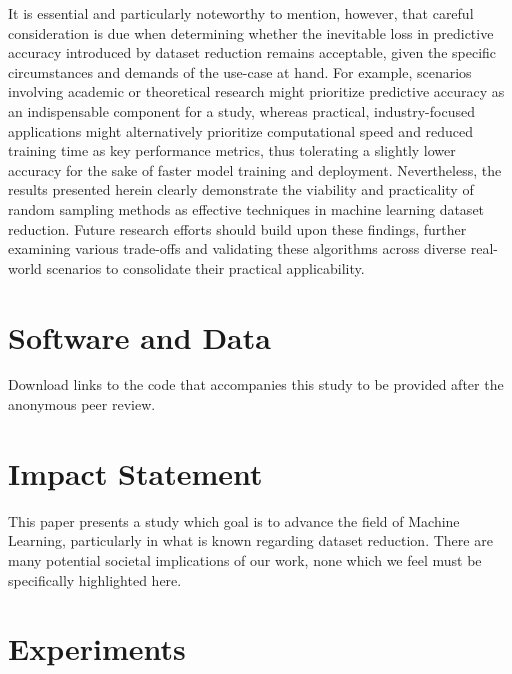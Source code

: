 \documentclass{article}
\theoremstyle{plain}
\theoremstyle{definition}
\theoremstyle{remark}
\begin{document}
It is essential and particularly noteworthy to mention, however, that careful consideration is due when determining whether the inevitable loss in predictive accuracy introduced by dataset reduction remains acceptable, given the specific circumstances and demands of the use-case at hand. For example, scenarios involving academic or theoretical research might prioritize predictive accuracy as an indispensable component for a study, whereas practical, industry-focused applications might alternatively prioritize computational speed and reduced training time as key performance metrics, thus tolerating a slightly lower accuracy for the sake of faster model training and deployment. Nevertheless, the results presented herein clearly demonstrate the viability and practicality of random sampling methods as effective techniques in machine learning dataset reduction. Future research efforts should build upon these findings, further examining various trade-offs and validating these algorithms across diverse real-world scenarios to consolidate their practical applicability.


\section*{Software and Data}

Download links to the code that accompanies this study to be provided after the anonymous peer review.

\section*{Impact Statement}

This paper presents a study which goal is to advance the field of
Machine Learning, particularly in what is known regarding dataset reduction. There are many potential societal implications
of our work, none which we feel must be specifically highlighted here.






\newpage
\appendix
\twocolumn
\section{Experiments}
\end{document}
